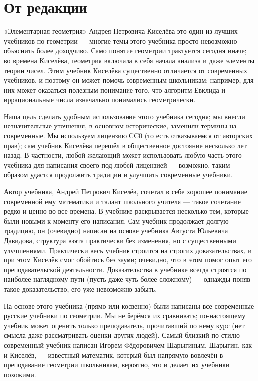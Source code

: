 \section*{От редакции}


«Элементарная геометрия» Андрея Петровича Киселёва это один из лучших учебников по геометрии ---
многие темы этого учебника просто невозможно объяснить более доходчиво.
Само понятие геометрии трактуется сегодня иначе;
во времена Киселёва, геометрия включала в себя начала анализа и даже элементы теории чисел.
Этим учебник Киселёва существенно отличается от современных учебников, и поэтому он может помочь современным школьникам;
например, для них может оказаться полезным понимание того, что алгоритм Евклида и иррациональные числа изначально понимались геометрически.

Наша цель сделать удобным использование этого учебника сегодня;
мы внесли незначительные уточнения, в основном исторические, заменили термины на современные. 
Мы используем лицензию CC0 (то есть отказываемся от авторских прав); сам учебник Киселёва перешёл в общественное достояние несколько лет назад.
В частности, любой желающий может использовать любую часть этого учебника для написания своего под любой лицензией ---
возможно, таким образом удастся продолжить традиции и улучшить современные учебники. 

Автор учебника, Андрей Петрович Киселёв, сочетал в себе хорошее понимание современной ему математики и талант школьного учителя --- такое сочетание редко и ценно во все времена.
В учебнике раскрывается несколько тем, которые были новыми к моменту его написания. 
Сам учебник продолжает долгую традицию, он (очевидно) написан на основе учебника Августа Юльевича Давидова, структура взята практически без изменения, но с существенными улучшениями.
Практически весь учебник строится на строгих доказательствах, и при этом Киселёв смог обойтись без зауми;
очевидно, что в этом помог опыт его преподавательской деятельности.
Доказательства в учебнике всегда строятся по наиболее наглядному пути (пусть даже чуть более сложному) --- однажды поняв такое доказательство, его уже невозможно забыть.

На основе этого учебника (прямо или косвенно) были написаны все современные русские учебники по геометрии.
Мы не берёмся их сравнивать; по-настоящему учебник может оценить только преподаватель, прочитавший по нему курс (нет смысла даже рассматривать оценки других людей).
Самый близкий по стилю современный учебник написан Игорем Фёдоровичем Шарыгиным.
Шарыгин, как и Киселёв, --- известный математик, который был напрямую вовлечён в преподавание геометрии школьникам, вероятно, это и делает их учебники похожими.

\clearpage
